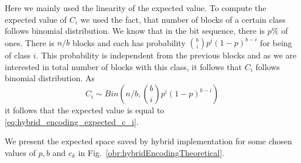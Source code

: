Here we mainly used the linearity of the expected value. To compute the expected value of
$C_i$ we used the fact, that number of blocks of a certain class follows binomial
distribution. We know that in the bit sequence, there is $p\%$ of ones. There is $n/b$ blocks
and each has probability ${b\choose i}p^i(1-p)^{b-i}$ for being of class $i$. This probability
is independent from the previous blocks and as we are interested in total number of blocks with
this class, it follows that $C_i$ follows binomial distribution. As
$$C_i \sim Bin(n/b, {b\choose i}p^i(1-p)^{b-i})$$ it follows that the expected value is equal to
\ref{eq:hybrid_encoding_expected_c_i}.

We present the expected space saved by hybrid implementation for some chosen values of
$p, b$ and $c_k$ in Fig.~\ref{obr:hybridEncodingTheoretical}.

